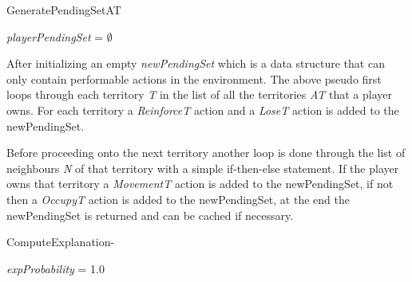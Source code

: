 \documentclass[parskip]{cs4rep}
\begin{document}
\begin{pseudocode}{GeneratePendingSet}{AT}
\begin{algorithm}[H]
\textit{playerPendingSet} = $\emptyset$

\end{algorithm}
\end{pseudocode}

After initializing an empty \textit{newPendingSet} which is a data structure that can only contain performable actions in the environment. The above pseudo first loops through each territory \textit{T} in the list of all the territories \textit{AT} that a player owns. For each territory a \textit{ReinforceT} action and a \textit{LoseT} action is added to the newPendingSet. 

Before proceeding onto the next territory another loop is done through the list of neighbours \textit{N} of that territory with a simple if-then-else statement. If the player owns that territory a \textit{MovementT} action is added to the newPendingSet, if not then a \textit{OccupyT} action is added to the newPendingSet, at the end the newPendingSet is returned and can be cached if necessary.

\begin{pseudocode}{ComputeExplanation}{-}
\begin{algorithm}[H]

\textit{expProbability} = 1.0




\end{algorithm}
\end{pseudocode}
\end{document}

